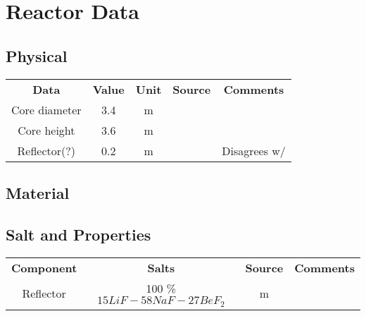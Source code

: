 \documentclass[12pt,a4paper]{article}
\begin{document}
\section{Reactor Data}

\subsection{Physical}

\begin{center}
\begin{tabular}{ c c c c c}

 \textbf{Data} &  \textbf{Value} & \textbf{Unit} & \textbf{Source} &  \textbf{Comments} \\ 
 
  Core diameter  &  3.4            & m             & \citep{ignatiev_molten_2014}  & \\
  
  
  Core height  &  3.6           & m             & \citep{ignatiev_molten_2014}  & \\
  
   
  Reflector(?)  &  0.2            & m             & \citep{ignatiev_molten_2014}  & Disagrees w/ \citep{wang_molten_2006}\\ 
  
  
  
  
  
\end{tabular}
\end{center}

\subsection{Material}

\subsection{Salt and Properties}
\begin{center}
\begin{tabular}{ c c c c}

 \textbf{Component} &  \textbf{Salts} & \textbf{Source} & \textbf{Comments} \\ 
 
  Reflector  &  100 \% $15LiF-58NaF-27BeF_2$  & m             & \citep{ignatiev_molten_2014}  \\
  
  
\end{tabular}
\end{center}



\end{document}
